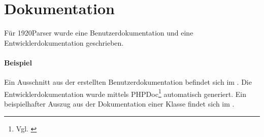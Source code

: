 \section{Dokumentation}
\label{sec:Dokumentation}
Für 1920Parser wurde eine Benutzerdokumentation und eine Entwicklerdokumentation geschrieben.

\paragraph{Beispiel}
Ein Ausschnitt aus der erstellten Benutzerdokumentation befindet sich im .
Die Entwicklerdokumentation wurde mittels PHPDoc\footnote{Vgl. \cite{phpDoc}} automatisch generiert. Ein beispielhafter Auszug aus der Dokumentation einer Klasse findet sich im . 

